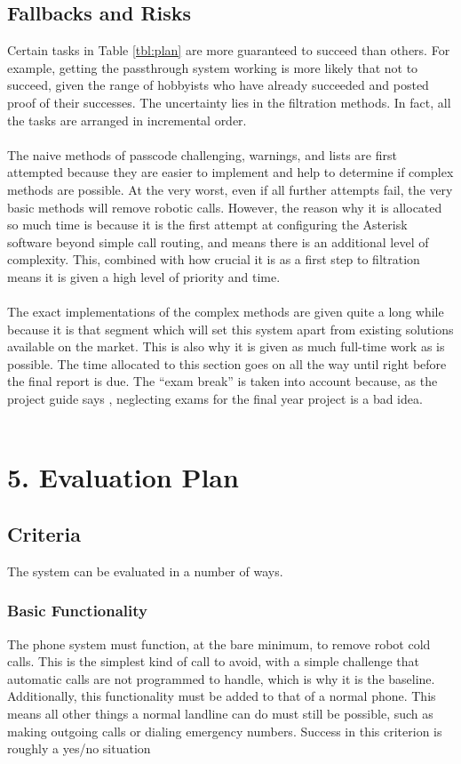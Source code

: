 \documentclass[12pt,a4paper]{report}
\newcommand{\mychapter}[2]
{
    \setcounter{chapter}{#1}
    \setcounter{section}{0}
    \chapter*{#2}
    \addcontentsline{toc}{chapter}{#2}
}
\begin{document}
\section{Fallbacks and Risks}
Certain tasks in Table \ref{tbl:plan} are more guaranteed to succeed than others. For example, getting the passthrough system working is more likely that not to succeed, given the range of hobbyists who have already succeeded and posted proof of their successes. The uncertainty lies in the filtration methods. In fact, all the tasks are arranged in incremental order.
\\\\
The naive methods of passcode challenging, warnings, and lists are first attempted because they are easier to implement and help to determine if complex methods are possible. At the very worst, even if all further attempts fail, the very basic methods will remove robotic calls. However, the reason why it is allocated so much time is because it is the first attempt at configuring the Asterisk software beyond simple call routing, and means there is an additional level of complexity. This, combined with how crucial it is as a first step to filtration means it is given a high level of priority and time.
\\\\
The exact implementations of the complex methods are given quite a long while because it is that segment which will set this system apart from existing solutions available on the market. This is also why it is given as much full-time work as is possible. The time allocated to this section goes on all the way until right before the final report is due. The ``exam break'' is taken into account because, as the project guide says \cite{guide}, neglecting exams for the final year project is a bad idea.
\\\\

\mychapter{5}{5. Evaluation Plan}
\section{Criteria}
The system can be evaluated in a number of ways.
\subsection{Basic Functionality}
The phone system must function, at the bare minimum, to remove robot cold calls. This is the simplest kind of call to avoid, with a simple challenge that automatic calls are not programmed to handle, which is why it is the baseline. Additionally, this functionality must be added to that of a normal phone. This means all other things a normal landline can do must still be possible, such as making outgoing calls or dialing emergency numbers. Success in this criterion is roughly a yes/no situation
\end{document}
